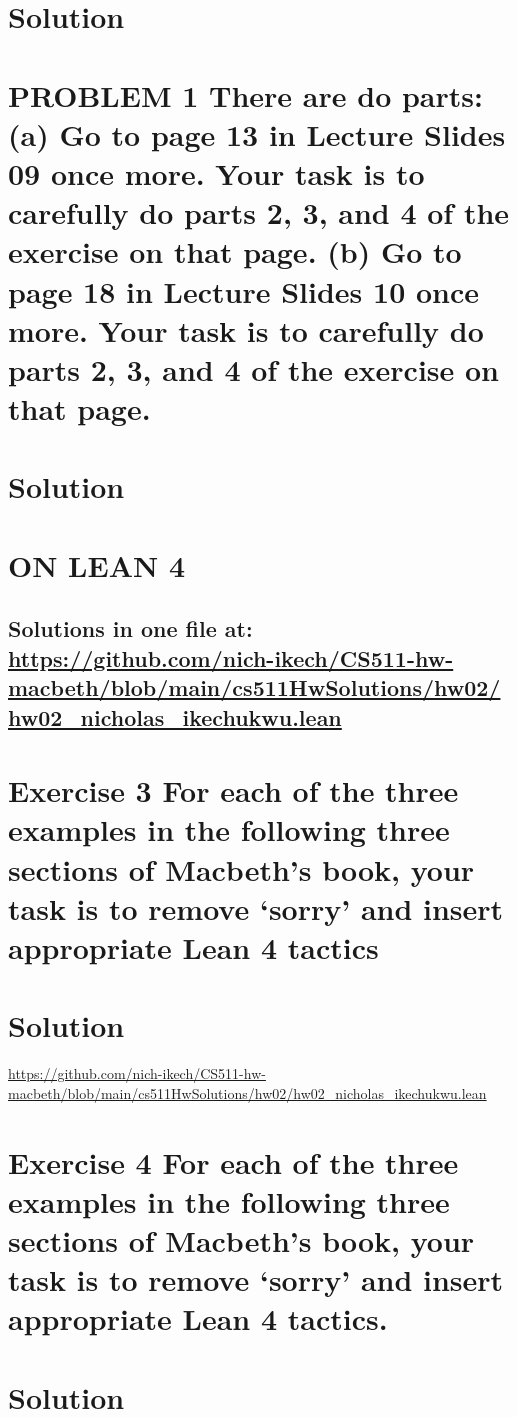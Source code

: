 \documentclass{article}
\begin{document}
\section*{Solution}


\newpage
\section*{PROBLEM 1 There are do parts:
(a) Go to page 13 in Lecture Slides 09 once more. Your task is to carefully do parts 2, 3, and 4
of the exercise on that page.
(b) Go to page 18 in Lecture Slides 10 once more. Your task is to carefully do parts 2, 3, and 4
of the exercise on that page.}
\section*{Solution} 



\newpage
\section*{ON LEAN 4}
\subsection*{Solutions in one file at: 
\url{https://github.com/nich-ikech/CS511-hw-macbeth/blob/main/cs511HwSolutions/hw02/hw02_nicholas_ikechukwu.lean}}

\newpage

\section*{Exercise 3 For each of the three examples in the following three sections of Macbeth’s book, your
task is to remove ‘sorry’ and insert appropriate Lean 4 tactics}
\section*{Solution}
\url{https://github.com/nich-ikech/CS511-hw-macbeth/blob/main/cs511HwSolutions/hw02/hw02_nicholas_ikechukwu.lean}

\newpage

\section*{Exercise 4 For each of the three examples in the following three sections of Macbeth’s book, your
task is to remove ‘sorry’ and insert appropriate Lean 4 tactics.}
\section*{Solution}
\end{document}
